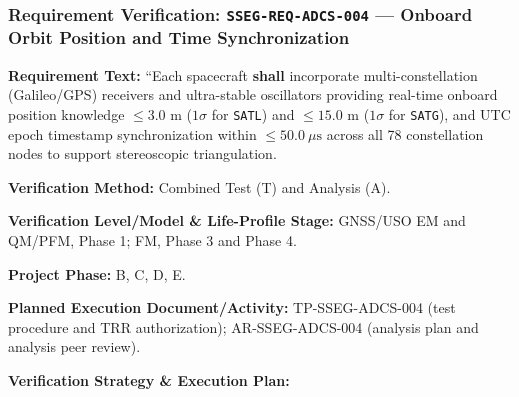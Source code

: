 \subsubsection{Requirement Verification: \texttt{SSEG-REQ-ADCS-004} --- Onboard Orbit Position and Time Synchronization}
\label{ver:SSEG-REQ-ADCS-004}
\textbf{Requirement Text:} ``Each spacecraft \textbf{shall} incorporate multi-constellation  (Galileo/GPS) receivers and ultra-stable oscillators providing real-time onboard position knowledge $\le 3.0\text{ m}$ ($1\sigma$ for \texttt{SATL}) and $\le 15.0\text{ m}$ ($1\sigma$ for \texttt{SATG}), and UTC epoch timestamp synchronization within $\le 50.0~\mu\mathrm{s}$ across all 78 constellation nodes to support stereoscopic triangulation.
\par\textbf{Verification Method:} Combined Test (T) and Analysis (A).
\par\textbf{Verification Level/Model \& Life-Profile Stage:} GNSS/USO EM and QM/PFM, Phase 1; FM, Phase 3 and Phase 4.
\par\textbf{Project Phase:} B, C, D, E.
\par\textbf{Planned Execution Document/Activity:} TP-SSEG-ADCS-004 (test procedure and TRR authorization); AR-SSEG-ADCS-004 (analysis plan and analysis peer review).
\par\textbf{Verification Strategy \& Execution Plan:}
